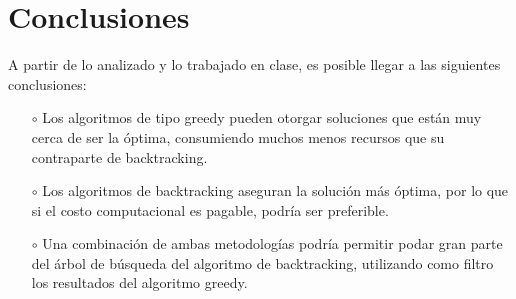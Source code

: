 \documentclass[10 pt, A4paper]{article}
\begin{document}
	\section*{Conclusiones}
	A partir de lo analizado y lo trabajado en clase, es posible llegar a las siguientes conclusiones:
	\begin{itemize}
		\item[$\circ$] Los algoritmos de tipo greedy pueden otorgar soluciones que están muy cerca de ser la óptima, consumiendo muchos menos recursos que su contraparte de backtracking.
		\item[$\circ$] Los algoritmos de backtracking aseguran la solución más óptima, por lo que si el costo computacional es pagable, podría ser preferible.
		\item[$\circ$] Una combinación de ambas metodologías podría permitir podar gran parte del árbol de búsqueda del algoritmo de backtracking, utilizando como filtro los resultados del algoritmo greedy.
	\end{itemize}
	
	
	
%		
	
	
\end{document}
